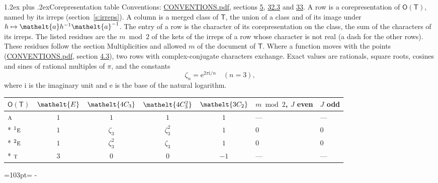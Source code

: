 \documentclass[10pt,a4paper]{article}
\makeatletter
\renewcommand\section{\@startsection{section}{1}{\z@}{-3ex plus -1ex minus -.2ex}%
  {1.2ex plus .2ex}{\normalfont\large\sffamily\bfseries\color{parttitle}}}
\newcommand{\needspace}[1]{\par\penalty-100\begingroup\dimen0=#1\relax\dimen2=\pagegoal
  \advance\dimen2-\pagetotal\ifdim\dimen0>\dimen2\relax\ifdim\dimen2>0pt\vfil\break\fi\fi
  \endgroup}
\numberwithin{equation}{section}
\newcommand{\eltfont}[1]{{\let\sigma\eltsigma\mathelt{#1}}}
\newcommand{\grp}[1]{\mathsf{#1}}
\newcommand{\irr}[1]{\text{\normalfont\scshape #1}}
\newcommand{\conjpair}[1]{{}^{#1}}
\newcommand{\cls}[1]{\eltfont{#1}}
\newcommand{\elt}[1]{\eltfont{#1}}
\newcommand{\iunit}{\mathrm{i}}
\newcommand{\expe}{\mathrm{e}}
\newcommand{\rootunity}[1]{\zeta_{#1}}
\makeatother
\begin{document}
\section{Corepresentation table}\label{s:character_table}
Conventions: \href{../../CONVENTIONS.pdf}{CONVENTIONS.pdf}, sections \href{../../../rotation/CONVENTIONS.pdf\#conv.5}{5}, \href{../../CONVENTIONS.pdf\#conv.32.3}{32.3} and \href{../../CONVENTIONS.pdf\#conv.33}{33}.
A row is a corepresentation of $\grp{O}(\grp{T})$, named by its irreps (section~\ref{s:irreps}). A column is a merged class of $\grp{T}$, the union of a class and of its image under $h \mapsto \elt{a} h^{-1} \elt{a}^{-1}$. The entry of a row is the character of its corepresentation on the class, the sum of the characters of its irreps.
\leavevmode\label{n:head.parity}The listed residues are the $m \bmod 2$ of the kets of the irreps of a row whose character is not real (a dash for the other rows). These residues follow the section Multiplicities and allowed $m$ of the document of \href{../../../rotation/data/pdf/T.pdf}{$\grp{T}$}. Where a function moves with the points (\href{../../CONVENTIONS.pdf}{CONVENTIONS.pdf}, section \href{../../../rotation/CONVENTIONS.pdf\#conv.4.3}{4.3}), two rows with complex-conjugate characters exchange.
\leavevmode\label{n:constant.root}\label{n:index.root.order}Exact values are rationals, square roots, cosines and sines of rational multiples of $\pi$, and the constants
\begin{equation}\label{e:constants}\rootunity{n} = \expe^{2\pi\iunit/n}\quad(n = 3),\end{equation}
where $\iunit$ is the imaginary unit and $\expe$ is the base of the natural logarithm.
{\small\setlength{\tabcolsep}{4pt}\begin{longtable}{@{}lccccll@{}}\toprule
$\grp{O}(\grp{T})$ & $\cls{E}$ & $\cls{4C_{3}}$ & $\cls{4C_{3}^{2}}$ & $\cls{3C_{2}}$ & $m \bmod 2$, $J$ even & $J$ odd\\\midrule\endhead
\bottomrule\endfoot\endlastfoot
$\irr{a}$ & $1$ & $1$ & $1$ & $1$ & --- & ---\\*
$\conjpair{1}\irr{e}$ & $1$ & $\rootunity{3}$ & $\rootunity{3}^{2}$ & $1$ & 0 & 0\\*
$\conjpair{2}\irr{e}$ & $1$ & $\rootunity{3}^{2}$ & $\rootunity{3}$ & $1$ & 0 & 0\\*
$\irr{t}$ & $3$ & $0$ & $0$ & $-1$ & --- & ---\\
\bottomrule\end{longtable}}
\needspace{103pt}
\end{document}
